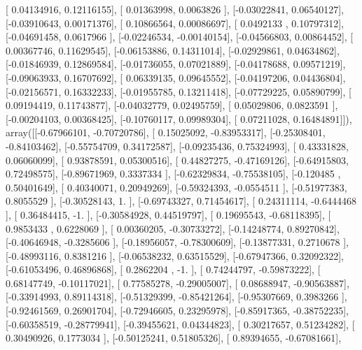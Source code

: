 \documentclass{article}
\begin{document}
       [ 0.04134916,  0.12116155],
       [ 0.01363998,  0.0063826 ],
       [-0.03022841,  0.06540127],
       [-0.03910643,  0.00171376],
       [ 0.10866564,  0.00086697],
       [ 0.0492133 ,  0.10797312],
       [-0.04691458,  0.0617966 ],
       [-0.02246534, -0.00140154],
       [-0.04566803,  0.00864452],
       [ 0.00367746,  0.11629545],
       [-0.06153886,  0.14311014],
       [-0.02929861,  0.04634862],
       [-0.01846939,  0.12869584],
       [-0.01736055,  0.07021889],
       [-0.04178688,  0.09571219],
       [-0.09063933,  0.16707692],
       [ 0.06339135,  0.09645552],
       [-0.04197206,  0.04436804],
       [-0.02156571,  0.16332233],
       [-0.01955785,  0.13211418],
       [-0.07729225,  0.05890799],
       [ 0.09194419,  0.11743877],
       [-0.04032779,  0.02495759],
       [ 0.05029806,  0.0823591 ],
       [-0.00204103,  0.00368425],
       [-0.10760117,  0.09989304],
       [ 0.07211028,  0.16484891]]), array([[-0.67966101, -0.70720786],
       [ 0.15025092, -0.83953317],
       [-0.25308401, -0.84103462],
       [-0.55754709,  0.34172587],
       [-0.09235436,  0.75324993],
       [ 0.43331828,  0.06060099],
       [ 0.93878591,  0.05300516],
       [ 0.44827275, -0.47169126],
       [-0.64915803,  0.72498575],
       [-0.89671969,  0.3337334 ],
       [-0.62329834, -0.75538105],
       [-0.120485  ,  0.50401649],
       [ 0.40340071,  0.20949269],
       [-0.59324393, -0.0554511 ],
       [-0.51977383,  0.8055529 ],
       [-0.30528143,  1.        ],
       [-0.69743327,  0.71454617],
       [ 0.24311114, -0.6444468 ],
       [ 0.36484415, -1.        ],
       [-0.30584928,  0.44519797],
       [ 0.19695543, -0.68118395],
       [ 0.9853433 ,  0.6228069 ],
       [ 0.00360205, -0.30733272],
       [-0.14248774,  0.89270842],
       [-0.40646948, -0.3285606 ],
       [-0.18956057, -0.78300609],
       [-0.13877331,  0.2710678 ],
       [-0.48993116,  0.8381216 ],
       [-0.06538232,  0.63515529],
       [-0.67947366,  0.32092322],
       [-0.61053496,  0.46896868],
       [ 0.2862204 , -1.        ],
       [ 0.74244797, -0.59873222],
       [ 0.68147749, -0.10117021],
       [ 0.77585278, -0.29005007],
       [ 0.08688947, -0.90563887],
       [-0.33914993,  0.89114318],
       [-0.51329399, -0.85421264],
       [-0.95307669,  0.3983266 ],
       [-0.92461569,  0.26901704],
       [-0.72946605,  0.23295978],
       [-0.85917365, -0.38752235],
       [-0.60358519, -0.28779941],
       [-0.39455621,  0.04344823],
       [ 0.30217657,  0.51234282],
       [ 0.30490926,  0.1773034 ],
       [-0.50125241,  0.51805326],
       [ 0.89394655, -0.67081661],
\end{document}
